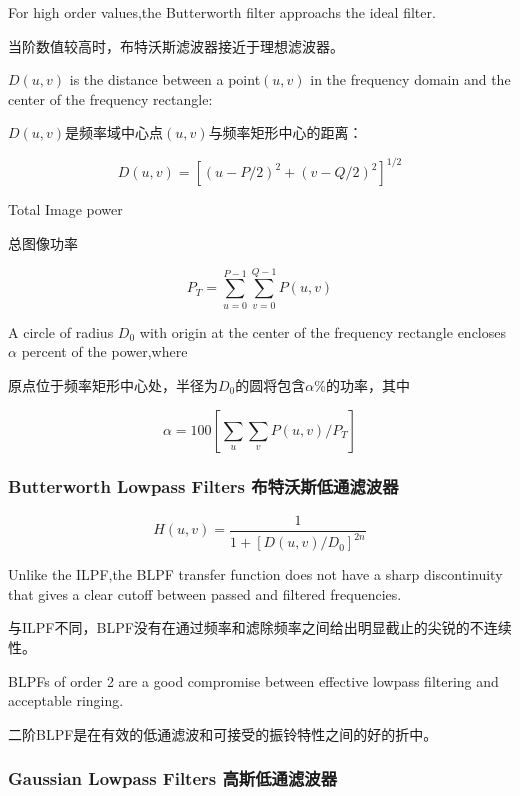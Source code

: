 \documentclass[12pt]{article}
\numberwithin{equation}{section}%
\begin{document}
For high order values,the Butterworth filter approachs the ideal filter.

当阶数值较高时，布特沃斯滤波器接近于理想滤波器。

$D(u,v)$ is the distance between a point$(u,v)$ in the frequency domain and the center of the frequency rectangle:

$D(u,v)$是频率域中心点$(u,v)$与频率矩形中心的距离：

\begin{equation} \label{4.45}
D(u,v)=[(u-P/2)^{2}+(v-Q/2)^{2}]^{1/2}
\end{equation}

Total Image power 

总图像功率

\begin{equation} \label{4.46}
P_{T}=\sum_{u=0}^{P-1}\sum_{v=0}^{Q-1}P(u,v)
\end{equation}

A circle of radius $D_{0}$ with origin at the center of the frequency rectangle encloses $\alpha$ percent of the power,where

原点位于频率矩形中心处，半径为$D_{0}$的圆将包含$\alpha$\%的功率，其中

\begin{equation} \label{4.47}
\alpha=100[\sum_{u}\sum_{v}P(u,v)/P_{T}]
\end{equation}

\subsubsection{Butterworth Lowpass Filters 布特沃斯低通滤波器}  

\begin{equation} \label{4.48}
H(u,v)=\frac{1}{1+[D(u,v)/D_{0}]^{2n}}
\end{equation}

Unlike the ILPF,the BLPF transfer function does not have a sharp discontinuity that gives a clear cutoff between passed and filtered frequencies.

与ILPF不同，BLPF没有在通过频率和滤除频率之间给出明显截止的尖锐的不连续性。

BLPFs of order 2 are a good compromise between effective lowpass filtering and acceptable ringing.

二阶BLPF是在有效的低通滤波和可接受的振铃特性之间的好的折中。

\subsubsection{Gaussian Lowpass Filters 高斯低通滤波器}
\end{document}
